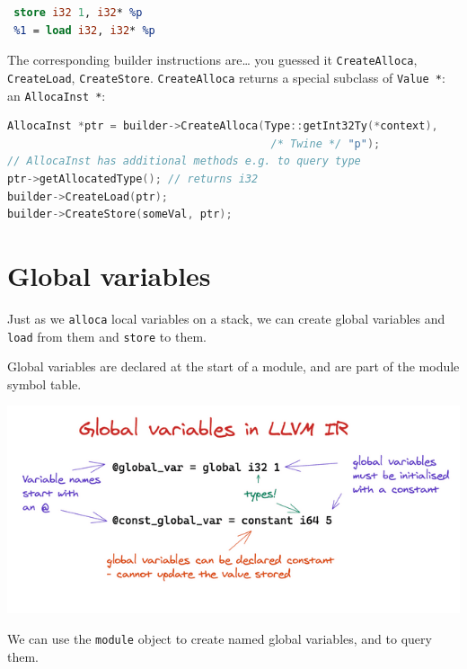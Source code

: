
\begin{lstlisting}[language=llvm]
%p = alloca i32 // store i32* pointer in %p
 store i32 1, i32* %p
 %1 = load i32, i32* %p
\end{lstlisting}

The corresponding builder instructions are\ldots{} you guessed it
\texttt{CreateAlloca}, \texttt{CreateLoad}, \texttt{CreateStore}.
\texttt{CreateAlloca} returns a special subclass of \texttt{Value\ *}:
an \texttt{AllocaInst\ *}:


\begin{lstlisting}[language=C++]
AllocaInst *ptr = builder->CreateAlloca(Type::getInt32Ty(*context),
                                         /* Twine */ "p");
// AllocaInst has additional methods e.g. to query type
ptr->getAllocatedType(); // returns i32
builder->CreateLoad(ptr);
builder->CreateStore(someVal, ptr);
\end{lstlisting}

\hypertarget{global-variables}{%
\section{\texorpdfstring{\protect\hyperlink{global-variables}{}Global
variables}{Global variables}}\label{global-variables}}

Just as we \texttt{alloca} local variables on a stack, we can create
global variables and \texttt{load} from them and \texttt{store} to them.

Global variables are declared at the start of a module, and are part of
the module symbol table.

{
\href{https://mukulrathi.com/static/c681b04ecad4a94c9d9144a337051ac9/74dae/global-variables.png}{{}
\includegraphics[width=\linewidth]{08_files/global-variables.png}} }

We can use the \texttt{module} object to create named global variables,
and to query them.

